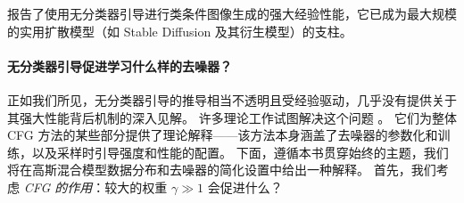 \documentclass[../../book-main_zh.tex]{subfiles}
\begin{document}
\begin{algorithm}
    \caption{使用分类数据和类条件去噪器进行条件采样。}
    \label{alg:iterative_denoising_conditional_CFG}
    \begin{algorithmic}[1]
        \EndFor
        \EndFunction
    \end{algorithmic}
\end{algorithm}

\textcite{Ho2022-ry} 报告了使用无分类器引导进行类条件图像生成的强大经验性能，它已成为最大规模的实用扩散模型（如 Stable Diffusion \cite{rombach2022high} 及其衍生模型）的支柱。

\paragraph{无分类器引导促进学习什么样的去噪器？}
正如我们所见，无分类器引导的推导相当不透明且受经验驱动，几乎没有提供关于其强大性能背后机制的深入见解。
许多理论工作试图解决这个问题 \cite{Bradley2024-jg,Li2025-li,Wu2024-js}。
它们为整体 CFG 方法的某些部分提供了理论解释——该方法本身涵盖了去噪器的参数化和训练，以及采样时引导强度和性能的配置。
下面，遵循本书贯穿始终的主题，我们将在高斯混合模型数据分布和去噪器的简化设置中给出一种解释。
首先，我们考虑 \textit{CFG 的作用}：较大的权重 $\gamma \gg 1$ 会促进什么？
\end{document}
